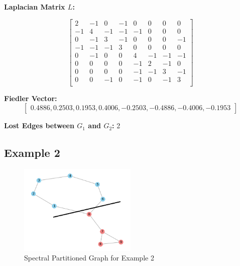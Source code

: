 \documentclass[hidelinks,12pt]{article}
\begin{document}
\noindent\textbf{Laplacian Matrix \(L\):}
\begin{adjustbox}{max width=\textwidth}
\[
\begin{bmatrix}
2 & -1 & 0 & -1 & 0 & 0 & 0 & 0 \\
-1 & 4 & -1 & -1 & -1 & 0 & 0 & 0 \\
0 & -1 & 3 & -1 & 0 & 0 & 0 & -1 \\
-1 & -1 & -1 & 3 & 0 & 0 & 0 & 0 \\
0 & -1 & 0 & 0 & 4 & -1 & -1 & -1 \\
0 & 0 & 0 & 0 & -1 & 2 & -1 & 0 \\
0 & 0 & 0 & 0 & -1 & -1 & 3 & -1 \\
0 & 0 & -1 & 0 & -1 & 0 & -1 & 3 \\
\end{bmatrix}
\]
\end{adjustbox}

\noindent\textbf{Fiedler Vector:}
\[
\begin{bmatrix}
0.4886, 0.2503, 0.1953, 0.4006, -0.2503, -0.4886, -0.4006, -0.1953 
\end{bmatrix}
\]

\noindent\textbf{Lost Edges between \(G_1\) and \(G_2\):} 2
\newpage
\subsection*{Example 2}

\begin{figure}[h!]
\centering
\includegraphics[width=0.5\textwidth]{figures/image05.png}
\caption{Spectral Partitioned Graph for Example 2}
\end{figure}
\end{document}
